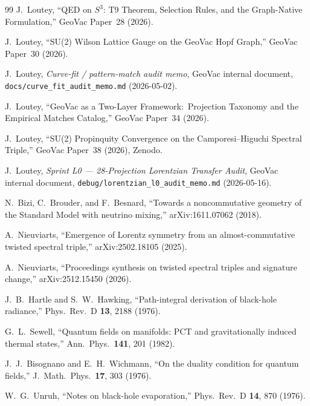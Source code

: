 \documentclass[twocolumn,pra,amsmath,amssymb,superscriptaddress]{revtex4-2}
\begin{document}
\begin{thebibliography}{99}
J.~Loutey,
``QED on $S^3$: T9 Theorem, Selection Rules, and the Graph-Native
Formulation,''
GeoVac Paper~28 (2026).

J.~Loutey,
``SU(2) Wilson Lattice Gauge on the GeoVac Hopf Graph,''
GeoVac Paper~30 (2026).

J.~Loutey,
\textit{Curve-fit / pattern-match audit memo},
GeoVac internal document, \texttt{docs/curve\_fit\_audit\_memo.md}
(2026-05-02).

J.~Loutey,
``GeoVac as a Two-Layer Framework:\ Projection Taxonomy and the
Empirical Matches Catalog,''
GeoVac Paper~34 (2026).

J.~Loutey,
``SU(2) Propinquity Convergence on the Camporesi--Higuchi Spectral
Triple,''
GeoVac Paper~38 (2026), Zenodo.

J.~Loutey,
\textit{Sprint L0 --- 28-Projection Lorentzian Transfer Audit},
GeoVac internal document, \texttt{debug/lorentzian\_l0\_audit\_memo.md}
(2026-05-16).

N.~Bizi, C.~Brouder, and F.~Besnard,
``Towards a noncommutative geometry of the Standard Model with
neutrino mixing,''
arXiv:1611.07062 (2018).

A.~Nieuviarts,
``Emergence of Lorentz symmetry from an almost-commutative twisted
spectral triple,''
arXiv:2502.18105 (2025).

A.~Nieuviarts,
``Proceedings synthesis on twisted spectral triples and signature
change,''
arXiv:2512.15450 (2026).

J.~B.~Hartle and S.~W.~Hawking,
``Path-integral derivation of black-hole radiance,''
Phys.\ Rev.\ D \textbf{13}, 2188 (1976).

G.~L.~Sewell,
``Quantum fields on manifolds: PCT and gravitationally induced thermal
states,''
Ann.\ Phys.\ \textbf{141}, 201 (1982).

J.~J.~Bisognano and E.~H.~Wichmann,
``On the duality condition for quantum fields,''
J.\ Math.\ Phys.\ \textbf{17}, 303 (1976).

W.~G.~Unruh,
``Notes on black-hole evaporation,''
Phys.\ Rev.\ D \textbf{14}, 870 (1976).

\end{thebibliography}
\end{document}
